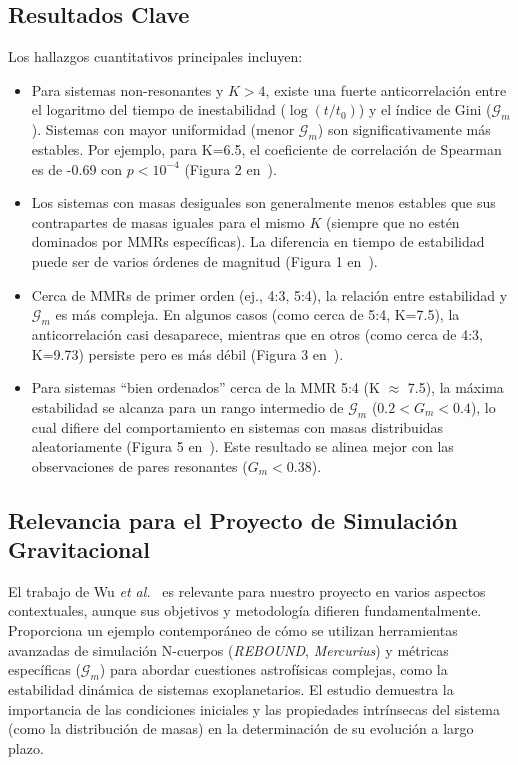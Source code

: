 \subsection[Resultados Clave]{Resultados Clave}
Los hallazgos cuantitativos principales incluyen:
\begin{itemize}
    \item Para sistemas non-resonantes y $K > 4$, existe una fuerte anticorrelación entre el logaritmo del tiempo de inestabilidad ($\log(t/t_0)$) y el índice de Gini ($\mathcal{G}_m$). Sistemas con mayor uniformidad (menor $\mathcal{G}_m$) son significativamente más estables. Por ejemplo, para K=6.5, el coeficiente de correlación de Spearman es de -0.69 con $p < 10^{-4}$ (Figura 2 en~\cite{Wu2025}).
    \item Los sistemas con masas desiguales son generalmente menos estables que sus contrapartes de masas iguales para el mismo $K$ (siempre que no estén dominados por MMRs específicas). La diferencia en tiempo de estabilidad puede ser de varios órdenes de magnitud (Figura 1 en~\cite{Wu2025}).
    \item Cerca de MMRs de primer orden (ej., 4:3, 5:4), la relación entre estabilidad y $\mathcal{G}_m$ es más compleja. En algunos casos (como cerca de 5:4, K=7.5), la anticorrelación casi desaparece, mientras que en otros (como cerca de 4:3, K=9.73) persiste pero es más débil (Figura 3 en~\cite{Wu2025}).
    \item Para sistemas ``bien ordenados'' cerca de la MMR 5:4 (K $\approx$ 7.5), la máxima estabilidad se alcanza para un rango intermedio de $\mathcal{G}_m$ ($0.2 < G_m < 0.4$), lo cual difiere del comportamiento en sistemas con masas distribuidas aleatoriamente (Figura 5 en~\cite{Wu2025}). Este resultado se alinea mejor con las observaciones de pares resonantes ($G_m < 0.38$).
\end{itemize}

\subsection{Relevancia para el Proyecto de Simulación Gravitacional}
El trabajo de Wu \textit{et al.}~\cite{Wu2025} es relevante para nuestro proyecto en varios aspectos contextuales, aunque sus objetivos y metodología difieren fundamentalmente. Proporciona un ejemplo contemporáneo de cómo se utilizan herramientas avanzadas de simulación N-cuerpos (\textit{REBOUND}, \textit{Mercurius}) y métricas específicas ($\mathcal{G}_m$) para abordar cuestiones astrofísicas complejas, como la estabilidad dinámica de sistemas exoplanetarios. El estudio demuestra la importancia de las condiciones iniciales y las propiedades intrínsecas del sistema (como la distribución de masas) en la determinación de su evolución a largo plazo.

